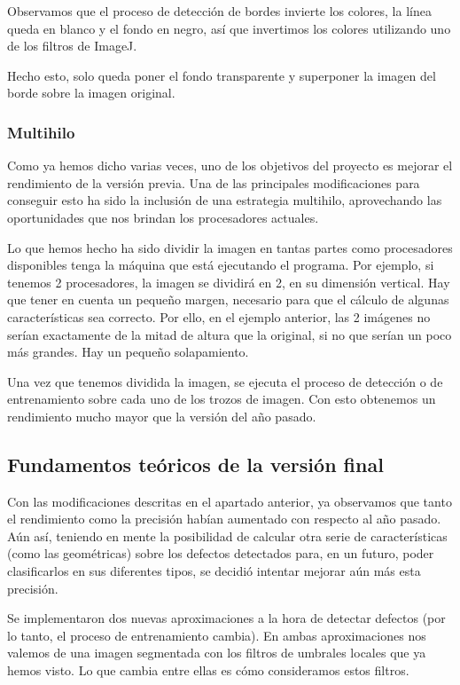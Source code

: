 Observamos que el proceso de detección de bordes invierte los colores, la línea queda en blanco y el fondo en negro, así que invertimos los colores utilizando uno de los filtros de ImageJ.

Hecho esto, solo queda poner el fondo transparente y superponer la imagen del borde sobre la imagen original.

\subsubsection{Multihilo}
Como ya hemos dicho varias veces, uno de los objetivos del proyecto es mejorar el rendimiento de la versión previa. Una de las principales modificaciones para conseguir esto ha sido la inclusión de una estrategia multihilo, aprovechando las oportunidades que nos brindan los procesadores actuales.

Lo que hemos hecho ha sido dividir la imagen en tantas partes como procesadores disponibles tenga la máquina que está ejecutando el programa. Por ejemplo, si tenemos 2 procesadores, la imagen se dividirá en 2, en su dimensión vertical. Hay que tener en cuenta un pequeño margen, necesario para que el cálculo de algunas características sea correcto. Por ello, en el ejemplo anterior, las 2 imágenes no serían exactamente de la mitad de altura que la original, si no que serían un poco más grandes. Hay un pequeño solapamiento.

Una vez que tenemos dividida la imagen, se ejecuta el proceso de detección o de entrenamiento sobre cada uno de los trozos de imagen. Con esto obtenemos un rendimiento mucho mayor que la versión del año pasado.


\subsection{Fundamentos teóricos de la versión final}
Con las modificaciones descritas en el apartado anterior, ya observamos que tanto el rendimiento como la precisión habían aumentado con respecto al año pasado. Aún así, teniendo en mente la posibilidad de calcular otra serie de características (como las geométricas) sobre los defectos detectados para, en un futuro, poder clasificarlos en sus diferentes tipos, se decidió intentar mejorar aún más esta precisión.

Se implementaron dos nuevas aproximaciones a la hora de detectar defectos (por lo tanto, el proceso de entrenamiento cambia). En ambas aproximaciones nos valemos de una imagen segmentada con los filtros de umbrales locales que ya hemos visto. Lo que cambia entre ellas es cómo consideramos estos filtros.

